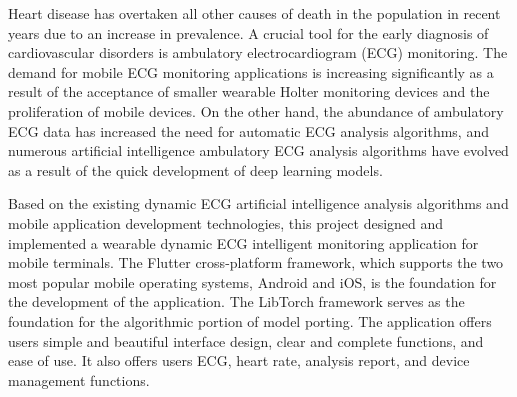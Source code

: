 \begin{abstractEN}

    Heart disease has overtaken all other causes of death in the population in recent years due to an increase in prevalence.
    A crucial tool for the early diagnosis of cardiovascular disorders is ambulatory electrocardiogram (ECG) monitoring.
    The demand for mobile ECG monitoring applications is increasing significantly as a result of the acceptance of smaller wearable Holter monitoring devices and the proliferation of mobile devices.
    On the other hand, the abundance of ambulatory ECG data has increased the need for automatic ECG analysis algorithms, and numerous artificial intelligence ambulatory ECG analysis algorithms have evolved as a result of the quick development of deep learning models.

    Based on the existing dynamic ECG artificial intelligence analysis algorithms and mobile application development technologies, this project designed and implemented a wearable dynamic ECG intelligent monitoring application for mobile terminals.
    The Flutter cross-platform framework, which supports the two most popular mobile operating systems, Android and iOS, is the foundation for the development of the application.
    The LibTorch framework serves as the foundation for the algorithmic portion of model porting.
    The application offers users simple and beautiful interface design, clear and complete functions, and ease of use.
    It also offers users ECG, heart rate, analysis report, and device management functions.

\end{abstractEN}
